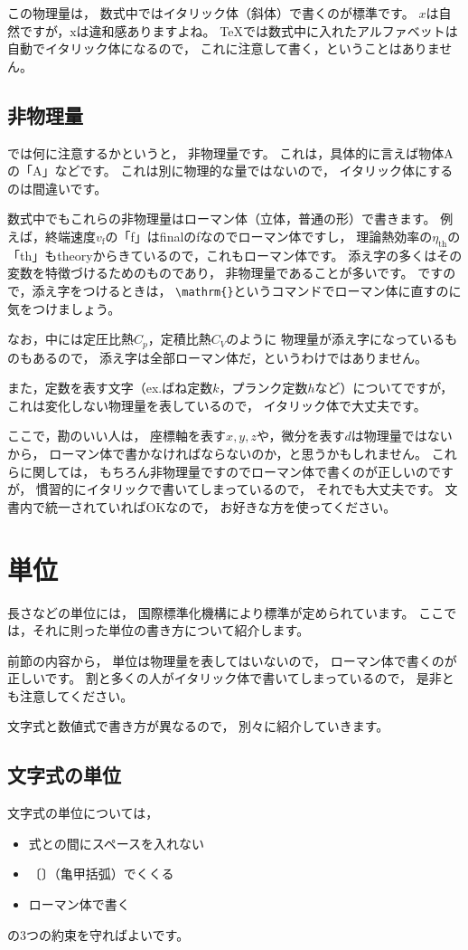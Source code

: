 この物理量は，
数式中ではイタリック体（斜体）で書くのが標準です。
$x$は自然ですが，$\mathrm{x}$は違和感ありますよね。
{\TeX}では数式中に入れたアルファベットは自動でイタリック体になるので，
これに注意して書く，ということはありません。


\subsection{非物理量}
では何に注意するかというと，
非物理量です。
これは，具体的に言えば物体Aの「A」などです。
これは別に物理的な量ではないので，
イタリック体にするのは間違いです。

数式中でもこれらの非物理量はローマン体（立体，普通の形）で書きます。
例えば，終端速度$v_{\mathrm{f}}$の「f」はfinalのfなのでローマン体ですし，
理論熱効率の$\eta_{\mathrm{th}}$の「th」もtheoryからきているので，これもローマン体です。
添え字の多くはその変数を特徴づけるためのものであり，
非物理量であることが多いです。
ですので，添え字をつけるときは，
\verb|\mathrm{}|というコマンドでローマン体に直すのに気をつけましょう。

なお，中には定圧比熱$C_p$，定積比熱$C_V$のように
物理量が添え字になっているものもあるので，
添え字は全部ローマン体だ，というわけではありません。

また，定数を表す文字（ex.ばね定数$k$，プランク定数$h$など）についてですが，
これは変化しない物理量を表しているので，
イタリック体で大丈夫です。

ここで，勘のいい人は，
座標軸を表す$x, y, z$や，微分を表す$d$は物理量ではないから，
ローマン体で書かなければならないのか，と思うかもしれません。
これらに関しては，
もちろん非物理量ですのでローマン体で書くのが正しいのですが，
慣習的にイタリックで書いてしまっているので，
それでも大丈夫です。
文書内で統一されていればOKなので，
お好きな方を使ってください。



\section{単位}
長さなどの単位には，
国際標準化機構により標準が定められています。
ここでは，それに則った単位の書き方について紹介します。

前節の内容から，
単位は物理量を表してはいないので，
ローマン体で書くのが正しいです。
割と多くの人がイタリック体で書いてしまっているので，
是非とも注意してください。

文字式と数値式で書き方が異なるので，
別々に紹介していきます。


\subsection{文字式の単位}
文字式の単位については，
\begin{itemize}
\item 式との間にスペースを入れない
\item 〔〕（亀甲括弧）でくくる
\item ローマン体で書く
\end{itemize}
の3つの約束を守ればよいです。


